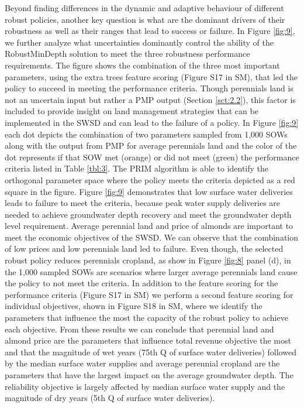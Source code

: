\documentclass[a4paper,fleqn]{cas-sc}
\begin{document}
Beyond finding differences in the dynamic and adaptive behaviour of different robust policies, another key question is what are the dominant drivers of their robustness as well as their ranges that lead to success or failure. In Figure \ref{fig:9}, we further analyze what uncertainties dominantly control the ability of the RobustMinDepth solution to meet the three robustness performance requirements. The figure shows the combination of the three most important parameters, using the extra trees feature scoring (Figure S17 in SM), that led the policy to succeed in meeting the performance criteria. Though perennials land is not an uncertain input but rather a PMP output (Section \ref{sct:2.2}), this factor is included to provide insight on land management strategies that can be implemented in the SWSD and can lead to the failure of a policy. In Figure \ref{fig:9} each dot depicts the combination of two parameters sampled from 1,000 SOWs along with the output from PMP for average perennials land and the color of the dot represents if that SOW met (orange) or did not meet (green) the performance criteria listed in Table \ref{tbl:3}. The PRIM algorithm is able to identify the orthogonal parameter space where the policy meets the criteria depicted as a red square in the figure. Figure \ref{fig:9} demonstrates that low surface water deliveries leads to failure to meet the criteria, because peak water supply deliveries are needed to achieve groundwater depth recovery and meet the groundwater depth level requirement. Average perennial land and price of almonds are important to meet the economic objectives of the SWSD. We can observe that the combination of low prices and low perennials land led to failure. Even though, the selected robust policy reduces perennials cropland, as show in Figure \ref{fig:8} panel (d), in the 1,000 sampled SOWs are scenarios where larger average perennials land cause the policy to not meet the criteria. In addition to the feature scoring for the performance criteria (Figure S17 in SM) we perform a second feature scoring for individual objectives, shown in Figure S18 in SM, where we identify the parameters that influence the most the capacity of the robust policy to achieve each objective. From these results we can conclude that perennial land and almond price are the parameters that influence total revenue objective the most and that the magnitude of wet years (75th Q of surface water deliveries) followed by the median surface water supplies and average perennial cropland are the parameters that have the largest impact on the average groundwater depth. The reliability objective is largely affected by median surface water supply and the magnitude of dry years (5th Q of surface water deliveries).
\end{document}
